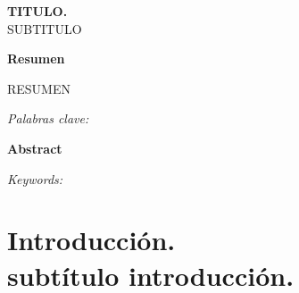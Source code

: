 \documentclass[a4paper,12pt]{report}
\begin{document}
\thispagestyle{plain}
\begin{center}
    \Large
    \textbf{TITULO.}\\
    \vspace{0.4cm}
    \large
SUBTITULO  \\
 \vspace{0.8cm}

    \textbf{Resumen} \\
 \normalsize
 \vspace{0.3cm}
 \begin{justify}

RESUMEN
 \end{justify}
 \vspace{0.6cm}
   
\textsl{Palabras clave:} \textsc{ }\\
    \cleardoublepage
	


\large
 \vspace{0.8cm}
    \textbf{Abstract} \\
     \normalsize
 \vspace{0.3cm}
  \begin{justify}
  
  
  \end{justify}
    \textsl{Keywords:}    \textsc{}

\end{center}



\chapter*{Introducción. \\{\huge subtítulo introducción.}}
{}
{} %
\end{document}

